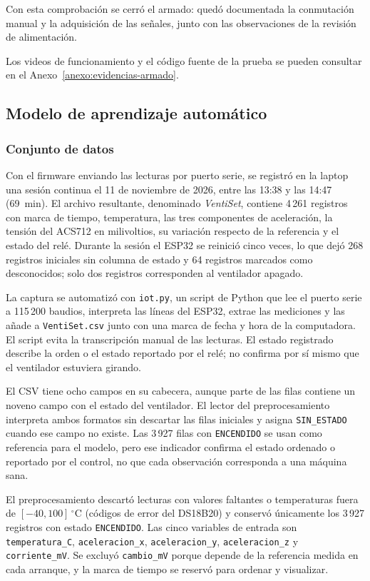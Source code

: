 \documentclass[10pt,twocolumn]{article}
\newcommand{\code}[1]{\texttt{\small #1}}
\begin{document}
Con esta comprobación se cerró el armado: quedó documentada la conmutación manual y la adquisición de las señales, junto con las observaciones de la revisión de alimentación.

Los videos de funcionamiento y el código fuente de la prueba se pueden
consultar en el Anexo~\ref{anexo:evidencias-armado}.

\subsection{Modelo de aprendizaje automático}

\subsubsection{Conjunto de datos}
Con el firmware enviando las lecturas por puerto serie, se registró en la laptop una sesión
continua el 11 de noviembre de 2026, entre las 13:38 y las 14:47 (69~min). El archivo resultante,
denominado \emph{VentiSet}, contiene 4\,261 registros con marca de tiempo, temperatura, las tres
componentes de aceleración, la tensión del ACS712 en milivoltios, su variación respecto de la
referencia y el estado del relé. Durante la sesión el ESP32 se reinició cinco veces, lo que dejó
268 registros iniciales sin columna de estado y 64 registros marcados como desconocidos; solo dos
registros corresponden al ventilador apagado.

La captura se automatizó con \code{iot.py}, un script de Python que lee el puerto serie a
115\,200 baudios, interpreta las líneas del ESP32, extrae las mediciones y las añade a
\code{VentiSet.csv} junto con una marca de fecha y hora de la computadora. El script evita la
transcripción manual de las lecturas. El estado registrado describe la orden o el estado reportado
por el relé; no confirma por sí mismo que el ventilador estuviera girando.

El CSV tiene ocho campos en su cabecera, aunque parte de las filas contiene un noveno campo con el
estado del ventilador. El lector del preprocesamiento interpreta ambos formatos sin descartar las
filas iniciales y asigna \code{SIN\_ESTADO} cuando ese campo no existe. Las 3\,927 filas con
\code{ENCENDIDO} se usan como referencia para el modelo, pero ese indicador confirma el estado
ordenado o reportado por el control, no que cada observación corresponda a una máquina sana.

El preprocesamiento descartó lecturas con valores faltantes o temperaturas fuera de
$[-40, 100]\,^{\circ}$C (códigos de error del DS18B20) y conservó únicamente los 3\,927 registros
con estado \code{ENCENDIDO}. Las cinco variables de entrada son \code{temperatura\_C},
\code{aceleracion\_x}, \code{aceleracion\_y}, \code{aceleracion\_z} y \code{corriente\_mV}. Se
excluyó \code{cambio\_mV} porque depende de la referencia medida en cada arranque, y la marca de
tiempo se reservó para ordenar y visualizar.
\end{document}
